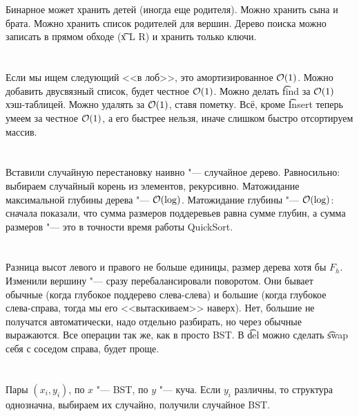 \section{} %
Бинарное может хранить детей (иногда еще родителя).
Можно хранить сына и брата.
Можно хранить список родителей для вершин.
Дерево поиска можно записать в прямом обходе (\t{x L R}) и хранить только ключи.

\section{} %
Если мы ищем следующий <<в лоб>>, это амортизированное $\mathcal{O}(1)$.
Можно добавить двусвязный список, будет честное $\mathcal{O}(1)$.
Можно делать \t{find} за $\mathcal{O}(1)$ хэш-таблицей.
Можно удалять за $\mathcal{O}(1)$, ставя пометку.
Всё, кроме \t{Insert} теперь умеем за честное $\mathcal{O}(1)$, а его быстрее нельзя, иначе слишком быстро отсортируем массив.

\section{} %
Вставили случайную перестановку наивно "--- случайное дерево.
Равносильно: выбираем случайный корень из элементов, рекурсивно.
Матожидание максимальной глубины дерева "--- $\mathcal{O}(\log)$.
Матожидание глубины "--- $\mathcal{O}(\log)$:
сначала показали, что сумма размеров поддеревьев равна сумме глубин,
а сумма размеров "--- это в точности время работы QuickSort.

\section{} %
Разница высот левого и правого не больше единицы, размер дерева хотя бы $F_h$.
Изменили вершину "--- сразу перебалансировали поворотом.
Они бывает обычные (когда глубокое поддерево слева-слева)
и большие (когда глубокое слева-справа, тогда мы его <<вытаскиваем>> наверх).
Нет, большие не получатся автоматически, надо отдельно разбирать, но через обычные выражаются.
Все операции так же, как в просто BST.
В \t{del} можно сделать \t{swap} себя с соседом справа, будет проще.

\section{} %
\TODO

\section{} %
Пары $(x_i, y_i)$, по $x$ "--- BST, по $y$ "--- куча.
Если $y_i$ различны, то структура однозначна, выбираем их случайно, получили случайное BST.

